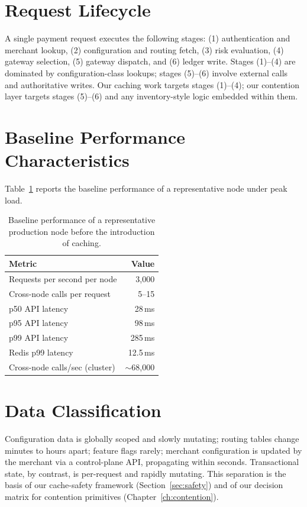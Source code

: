 \section{Request Lifecycle}
A single payment request executes the following stages: (1) authentication and merchant lookup, (2) configuration and routing fetch, (3) risk evaluation, (4) gateway selection, (5) gateway dispatch, and (6) ledger write. Stages (1)--(4) are dominated by configuration-class lookups; stages (5)--(6) involve external calls and authoritative writes. Our caching work targets stages (1)--(4); our contention layer targets stages (5)--(6) and any inventory-style logic embedded within them.

\section{Baseline Performance Characteristics}
Table~\ref{tab:baseline} reports the baseline performance of a representative node under peak load.

\begin{table}[h]
\centering
\begin{tabular}{lr}
\toprule
\textbf{Metric} & \textbf{Value} \\
\midrule
Requests per second per node      & 3{,}000  \\
Cross-node calls per request      & 5--15    \\
p50 API latency                   & 28\,ms   \\
p95 API latency                   & 98\,ms   \\
p99 API latency                   & 285\,ms  \\
Redis p99 latency                 & 12.5\,ms \\
Cross-node calls/sec (cluster)    & $\sim$68{,}000 \\
\bottomrule
\end{tabular}
\caption{Baseline performance of a representative production node before the introduction of caching.}
\label{tab:baseline}
\end{table}

\section{Data Classification}
Configuration data is globally scoped and slowly mutating; routing tables change minutes to hours apart; feature flags rarely; merchant configuration is updated by the merchant via a control-plane API, propagating within seconds. Transactional state, by contrast, is per-request and rapidly mutating. This separation is the basis of our cache-safety framework (Section~\ref{sec:safety}) and of our decision matrix for contention primitives (Chapter~\ref{ch:contention}).

